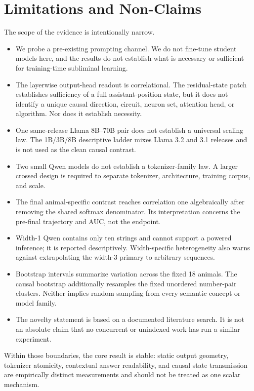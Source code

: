 \section{Limitations and Non-Claims}
\label{sec:limitations}

The scope of the evidence is intentionally narrow.

\begin{itemize}
  \item We probe a pre-existing prompting channel. We do not fine-tune student
  models here, and the results do not establish what is necessary or sufficient
  for training-time subliminal learning.

  \item The layerwise output-head readout is correlational. The residual-state
  patch establishes sufficiency of a full assistant-position state, but it does
  not identify a unique causal direction, circuit, neuron set, attention head,
  or algorithm. Nor does it establish necessity.

  \item One same-release Llama 8B--70B pair does not establish a universal
  scaling law. The 1B/3B/8B descriptive ladder mixes Llama 3.2 and 3.1 releases
  and is not used as the clean causal contrast.

  \item Two small Qwen models do not establish a tokenizer-family law. A larger
  crossed design is required to separate tokenizer, architecture, training
  corpus, and scale.

  \item The final animal-specific contrast reaches correlation one algebraically
  after removing the shared softmax denominator. Its interpretation concerns
  the pre-final trajectory and AUC, not the endpoint.

  \item Width-1 Qwen contains only ten strings and cannot support a powered
  inference; it is reported descriptively. Width-specific heterogeneity also
  warns against extrapolating the width-3 primary to arbitrary sequences.

  \item Bootstrap intervals summarize variation across the fixed 18 animals.
  The causal bootstrap additionally resamples the fixed unordered number-pair
  clusters. Neither implies random sampling from every semantic concept or model
  family.

  \item The novelty statement is based on a documented literature search. It is
  not an absolute claim that no concurrent or unindexed work has run a similar
  experiment.
\end{itemize}

Within those boundaries, the core result is stable: static output geometry,
tokenizer atomicity, contextual answer readability, and causal state
transmission are empirically distinct measurements and should not be treated as
one scalar mechanism.

